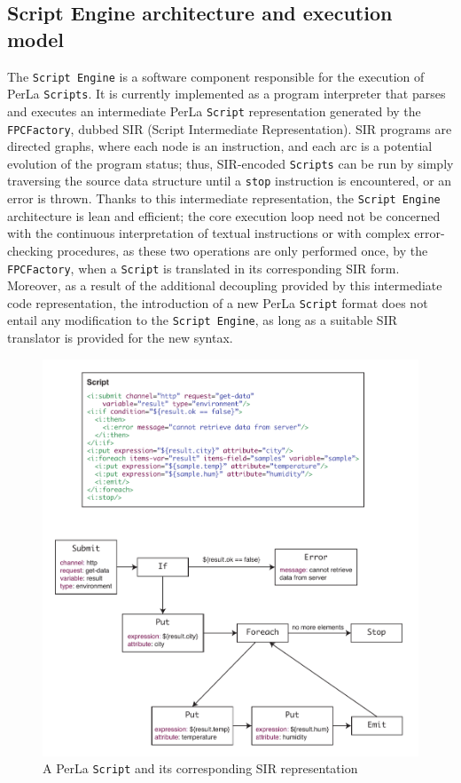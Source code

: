 \subsection{Script Engine architecture and execution model}

The \texttt{Script Engine} is a software component responsible for the
execution of PerLa \texttt{Scripts}. It is currently implemented as a program
interpreter that parses and executes an intermediate PerLa \texttt{Script}
representation generated by the \texttt{FPCFactory}, dubbed SIR (Script
Intermediate Representation). SIR programs are directed graphs, where each node
is an instruction, and each arc is a potential evolution of the program status;
thus, SIR-encoded \texttt{Scripts} can be run by simply traversing the source
data structure until a \texttt{stop} instruction is encountered, or an error is
thrown. Thanks to this intermediate representation, the \texttt{Script Engine}
architecture is lean and efficient; the core execution loop need not be
concerned with the continuous interpretation of textual instructions or with
complex error-checking procedures, as these two operations are only performed
once, by the \texttt{FPCFactory}, when a \texttt{Script} is translated in its
corresponding SIR form. Moreover, as a result of the additional decoupling
provided by this intermediate code representation, the introduction of a new
PerLa \texttt{Script} format does not entail any modification to the
\texttt{Script Engine}, as long as a suitable SIR translator is provided for
the new syntax.

\begin{figure}[h!]
\includegraphics[width=\textwidth]{imgs/script_sir.pdf}
\caption{A PerLa \texttt{Script} and its corresponding SIR representation}
\end{figure}

